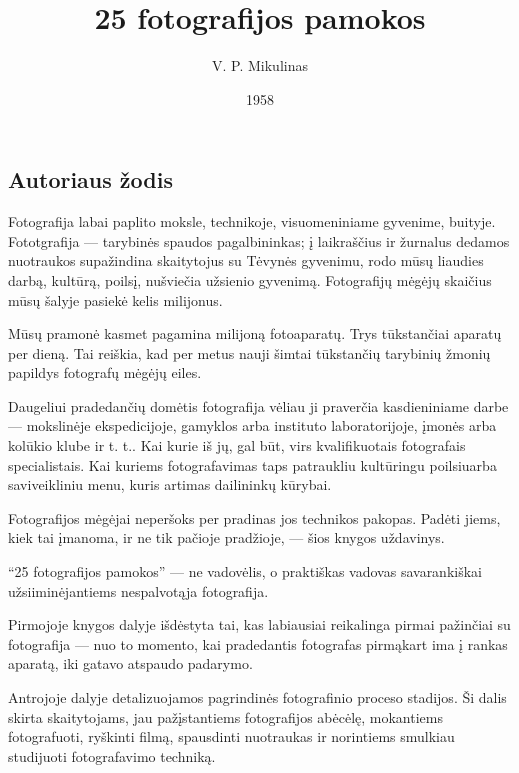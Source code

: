 \documentclass[12pt]{book}
\title{25 fotografijos pamokos}
\author{V. P. Mikulinas}
\date{1958}
\begin{document}
	\clearpage
	\thispagestyle{empty}

	\maketitle

	\pagebreak
	\cleardoublepage
	\chapter*{}
	\section*{Autoriaus žodis}
		Fotografija labai paplito moksle, technikoje, visuomeniniame gyvenime, buityje. Fototgrafija --- tarybinės spaudos pagalbininkas; į laikraščius ir žurnalus dedamos nuotraukos supažindina skaitytojus su Tėvynės gyvenimu, rodo mūsų liaudies darbą, kultūrą, poilsį, nušviečia užsienio gyvenimą. Fotografijų mėgėjų skaičius mūsų šalyje pasiekė kelis milijonus.

		Mūsų pramonė kasmet pagamina milijoną fotoaparatų. Trys tūkstančiai aparatų per dieną. Tai reiškia, kad per metus nauji šimtai tūkstančių tarybinių žmonių papildys fotografų mėgėjų eiles.

		Daugeliui pradedančių domėtis fotografija vėliau ji praverčia kasdieniniame darbe --- mokslinėje ekspedicijoje, gamyklos arba instituto laboratorijoje, įmonės arba kolūkio klube ir t. t.. Kai kurie iš jų, gal būt, virs kvalifikuotais fotografais specialistais. Kai kuriems fotografavimas taps patraukliu kultūringu poilsiuarba saviveikliniu menu, kuris artimas dailininkų kūrybai.

		Fotografijos mėgėjai neperšoks per pradinas jos technikos pakopas. Padėti jiems, kiek tai įmanoma, ir ne tik pačioje pradžioje, --- šios knygos uždavinys.

		``25 fotografijos pamokos''  --- ne vadovėlis, o praktiškas vadovas savarankiškai užsiiminėjantiems nespalvotąja fotografija.

		Pirmojoje knygos dalyje išdėstyta tai, kas labiausiai reikalinga pirmai pažinčiai su fotografija --- nuo to momento, kai pradedantis fotografas pirmąkart ima į rankas aparatą, iki gatavo atspaudo padarymo.

		Antrojoje dalyje detalizuojamos pagrindinės fotografinio proceso stadijos. Ši dalis skirta skaitytojams, jau pažįstantiems fotografijos abėcėlę, mokantiems fotografuoti, ryškinti filmą, spausdinti nuotraukas ir norintiems smulkiau studijuoti fotografavimo techniką.
\end{document}
